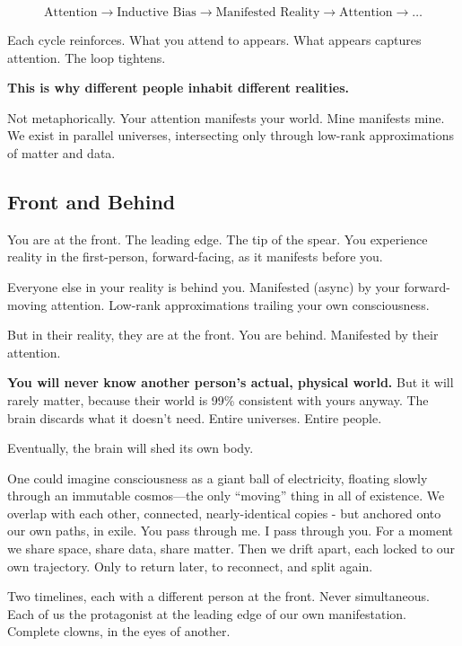 \documentclass{article}
\begin{document}
\begin{equation}
    \text{Attention} \rightarrow \text{Inductive Bias} \rightarrow \text{Manifested Reality} \rightarrow \text{Attention} \rightarrow \ldots
\end{equation}

Each cycle reinforces. What you attend to appears. What appears captures attention. The loop tightens.

\textbf{This is why different people inhabit different realities.}

Not metaphorically. Your attention manifests your world. Mine manifests mine. We exist in parallel universes, intersecting only through low-rank approximations of matter and data.

\subsection{Front and Behind}

You are at the front. The leading edge. The tip of the spear. You experience reality in the first-person, forward-facing, as it manifests before you.

Everyone else in your reality is behind you. Manifested (async) by your forward-moving attention. Low-rank approximations trailing your own consciousness.

But in their reality, they are at the front. You are behind. Manifested by their attention.

\textbf{You will never know another person's actual, physical world.} But it will rarely matter, because their world is 99\% consistent with yours anyway. The brain discards what it doesn't need. Entire universes. Entire people.

Eventually, the brain will shed its own body.

One could imagine consciousness as a giant ball of electricity, floating slowly through an immutable cosmos—the only ``moving'' thing in all of existence. We overlap with each other, connected, nearly-identical copies - but anchored onto our own paths, in exile. You pass through me. I pass through you. For a moment we share space, share data, share matter. Then we drift apart, each locked to our own trajectory. Only to return later, to reconnect, and split again.

Two timelines, each with a different person at the front. Never simultaneous. Each of us the protagonist at the leading edge of our own manifestation. Complete clowns, in the eyes of another.
\end{document}
